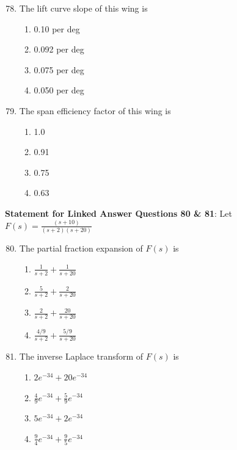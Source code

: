 \documentclass{article}
\begin{document}
\begin{enumerate}
    \setcounter{enumi}{77}
    \item The lift curve slope of this wing is
    \begin{multicols}{4}
    \begin{enumerate}
        \item 0.10 per deg
        \item 0.092 per deg
        \item 0.075 per deg
        \item 0.050 per deg
    \end{enumerate}
    \end{multicols}
    

    \item The span efficiency factor of this wing is
    \begin{multicols}{4}
    \begin{enumerate}
        \item 1.0
        \item 0.91
        \item 0.75
        \item 0.63
    \end{enumerate}
    \end{multicols}
    
\end{enumerate}

\textbf{Statement for Linked Answer Questions 80 \& 81}:
Let $F(s) = \frac{(s + 10)}{(s +2)(s + 20)}$

\begin{enumerate}
    \setcounter{enumi}{79}
    \item The partial fraction expansion of $F(s)$ is
    \begin{multicols}{2}
    \begin{enumerate}
        \item $\frac{1}{s + 2} + \frac{1}{s + 20}$
        \item $\frac{5}{s + 2} + \frac{2}{s + 20}$
        \item $\frac{2}{s + 2} + \frac{20}{s + 20}$
        \item $\frac{4/9}{s + 2} + \frac{5/9}{s + 20}$
    \end{enumerate}
    \end{multicols}
    

    \item The inverse Laplace transform of $F(s)$ is
    \begin{multicols}{2}
    \begin{enumerate}
        \item $2e^{-34} + 20e^{-34}$
        \item $\frac{4}{9}e^{-34} + \frac{5}{9}e^{-34}$
        \item $5e^{-34} + 2e^{-34}$
        \item $\frac{9}{4}e^{-34} + \frac{9}{5}e^{-34}$
    \end{enumerate}
    \end{multicols}
    
\end{enumerate}
\end{document}
